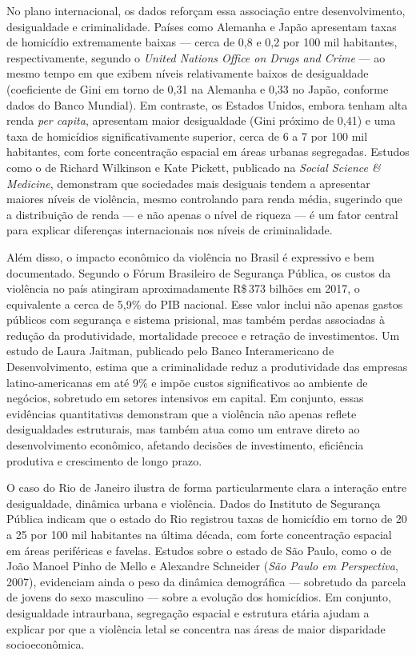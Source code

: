 \documentclass[11pt,a4paper]{article}
\newcommand{\reais}[1]{R\$\,#1}
\begin{document}
No plano internacional, os dados reforçam essa associação entre desenvolvimento, desigualdade e
criminalidade. Países como Alemanha e Japão apresentam taxas de homicídio extremamente baixas ---
cerca de 0,8 e 0,2 por 100 mil habitantes, respectivamente, segundo o \emph{United Nations Office on
Drugs and Crime} --- ao mesmo tempo em que exibem níveis relativamente baixos de desigualdade
(coeficiente de Gini em torno de 0,31 na Alemanha e 0,33 no Japão, conforme dados do Banco Mundial).
Em contraste, os Estados Unidos, embora tenham alta renda \emph{per capita}, apresentam maior
desigualdade (Gini próximo de 0,41) e uma taxa de homicídios significativamente superior, cerca de 6
a 7 por 100 mil habitantes, com forte concentração espacial em áreas urbanas segregadas. Estudos
como o de Richard Wilkinson e Kate Pickett, publicado na \emph{Social Science \& Medicine},
demonstram que sociedades mais desiguais tendem a apresentar maiores níveis de violência, mesmo
controlando para renda média, sugerindo que a distribuição de renda --- e não apenas o nível de
riqueza --- é um fator central para explicar diferenças internacionais nos níveis de criminalidade.

Além disso, o impacto econômico da violência no Brasil é expressivo e bem documentado. Segundo o
Fórum Brasileiro de Segurança Pública, os custos da violência no país atingiram aproximadamente
\reais{373} bilhões em 2017, o equivalente a cerca de 5,9\% do PIB nacional. Esse valor inclui não
apenas gastos públicos com segurança e sistema prisional, mas também perdas associadas à redução da
produtividade, mortalidade precoce e retração de investimentos. Um estudo de Laura Jaitman, publicado
pelo Banco Interamericano de Desenvolvimento, estima que a criminalidade reduz a produtividade das
empresas latino-americanas em até 9\% e impõe custos significativos ao ambiente de negócios,
sobretudo em setores intensivos em capital. Em conjunto, essas evidências quantitativas demonstram
que a violência não apenas reflete desigualdades estruturais, mas também atua como um entrave direto
ao desenvolvimento econômico, afetando decisões de investimento, eficiência produtiva e crescimento
de longo prazo.

O caso do Rio de Janeiro ilustra de forma particularmente clara a interação entre desigualdade,
dinâmica urbana e violência. Dados do Instituto de Segurança Pública indicam que o estado do Rio
registrou taxas de homicídio em torno de 20 a 25 por 100 mil habitantes na última década, com forte
concentração espacial em áreas periféricas e favelas. Estudos sobre o estado de São Paulo, como o
de João Manoel Pinho de Mello e Alexandre Schneider (\emph{São Paulo em Perspectiva}, 2007),
evidenciam ainda o peso da dinâmica demográfica --- sobretudo da parcela de jovens do sexo
masculino --- sobre a evolução dos homicídios. Em conjunto, desigualdade intraurbana, segregação
espacial e estrutura etária ajudam a explicar por que a violência letal se concentra nas áreas de
maior disparidade socioeconômica.
\end{document}
